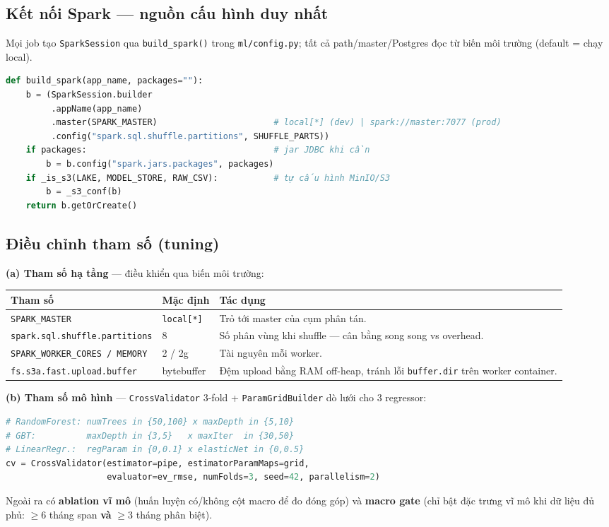 \documentclass[12pt,a4paper]{article}
\begin{document}
\subsection{Kết nối Spark --- nguồn cấu hình duy nhất}
Mọi job tạo \texttt{SparkSession} qua \texttt{build\_spark()} trong \texttt{ml/config.py}; tất cả path/master/Postgres đọc từ biến môi trường (default = chạy local).

\begin{lstlisting}[language=Python, caption={Kết nối Spark + tự bật S3A khi dùng MinIO (rút gọn từ ml/config.py)}]
def build_spark(app_name, packages=""):
    b = (SparkSession.builder
         .appName(app_name)
         .master(SPARK_MASTER)                       # local[*] (dev) | spark://master:7077 (prod)
         .config("spark.sql.shuffle.partitions", SHUFFLE_PARTS))
    if packages:                                     # jar JDBC khi cần
        b = b.config("spark.jars.packages", packages)
    if _is_s3(LAKE, MODEL_STORE, RAW_CSV):           # tự cấu hình MinIO/S3
        b = _s3_conf(b)
    return b.getOrCreate()
\end{lstlisting}

\subsection{Điều chỉnh tham số (tuning)}
\textbf{(a) Tham số hạ tầng} --- điều khiển qua biến môi trường:
\begin{center}
\begin{tabularx}{\textwidth}{@{}l l X@{}}
\toprule
\textbf{Tham số} & \textbf{Mặc định} & \textbf{Tác dụng} \\
\midrule
\texttt{SPARK\_MASTER} & \texttt{local[*]} & Trỏ tới master của cụm phân tán. \\
\texttt{spark.sql.shuffle.partitions} & 8 & Số phân vùng khi shuffle --- cân bằng song song vs overhead. \\
\texttt{SPARK\_WORKER\_CORES / MEMORY} & 2 / 2g & Tài nguyên mỗi worker. \\
\texttt{fs.s3a.fast.upload.buffer} & bytebuffer & Đệm upload bằng RAM off-heap, tránh lỗi \texttt{buffer.dir} trên worker container. \\
\bottomrule
\end{tabularx}
\end{center}

\textbf{(b) Tham số mô hình} --- \texttt{CrossValidator} 3-fold + \texttt{ParamGridBuilder} dò lưới cho 3 regressor:
\begin{lstlisting}[language=Python, caption={Lưới siêu tham số (rút gọn từ ml/train.py)}]
# RandomForest: numTrees in {50,100} x maxDepth in {5,10}
# GBT:          maxDepth in {3,5}   x maxIter  in {30,50}
# LinearRegr.:  regParam in {0,0.1} x elasticNet in {0,0.5}
cv = CrossValidator(estimator=pipe, estimatorParamMaps=grid,
                    evaluator=ev_rmse, numFolds=3, seed=42, parallelism=2)
\end{lstlisting}
Ngoài ra có \textbf{ablation vĩ mô} (huấn luyện có/không cột macro để đo đóng góp) và \textbf{macro gate} (chỉ bật đặc trưng vĩ mô khi dữ liệu đủ phủ: $\geq$6 tháng span \textbf{và} $\geq$3 tháng phân biệt).
\end{document}
